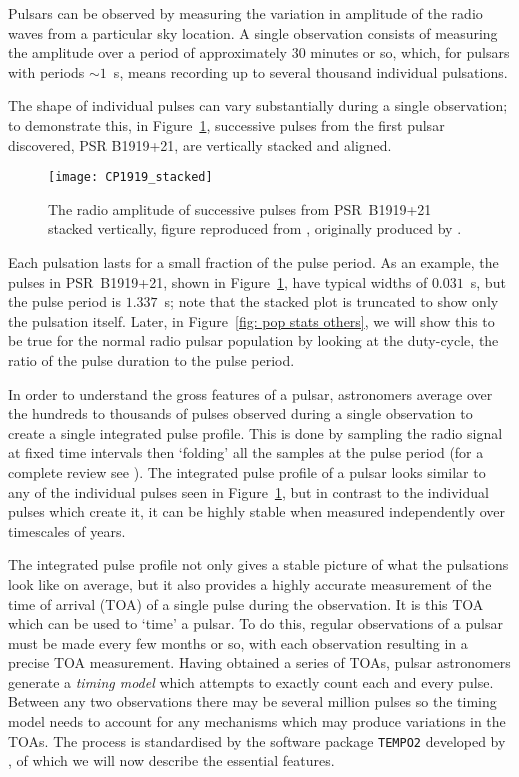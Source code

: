Pulsars can be observed by measuring the variation in amplitude of the radio
waves from a particular sky location. A single observation consists of measuring
the amplitude over a period of approximately $30$ minutes or so, which, for pulsars
with periods $\sim 1$~s, means recording up to several thousand individual pulsations.

The shape of individual pulses can vary substantially during a single
observation; to demonstrate this, in Figure~\ref{fig: CP1919 stacked}, successive pulses
from the first pulsar discovered, PSR B1919+21, are vertically stacked and
aligned.
\begin{figure}[htb]
\centering
\texttt{[image: CP1919\_stacked]}
\caption{The radio amplitude of successive pulses from PSR~B1919+21 stacked
vertically, figure reproduced from \citet{mitton1977cambridge}, originally
produced by \citet{craft1970}.}
\label{fig: CP1919 stacked}
\end{figure}
Each pulsation lasts for a small fraction of the pulse period. As an example,
the pulses in PSR~B1919+21, shown in Figure~\ref{fig: CP1919 stacked}, have
typical widths of $0.031$~s, but the pulse period is $1.337$~s; note that the
stacked plot is truncated to show only the pulsation itself. Later,
in Figure~\ref{fig: pop stats others}, we will show this to be true for the
normal radio pulsar population by looking at the duty-cycle, the ratio of the
pulse duration to the pulse period.

In order to understand the gross features of a pulsar, astronomers average over
the hundreds to thousands of pulses observed during a single observation to
create a single integrated pulse profile. This is done by sampling the radio
signal at fixed time intervals then `folding' all the samples at the pulse
period (for a complete review see \citet{Lyne2012book}). The integrated pulse
profile of a pulsar looks similar to any of the individual pulses seen in
Figure~\ref{fig: CP1919 stacked}, but in contrast to the individual pulses which
create it, it can be highly stable when measured independently over timescales
of years.

The integrated pulse profile not only gives a stable picture of what the
pulsations look like on average, but it also provides a highly accurate
measurement of the time of arrival (TOA) of a single pulse during the
observation. It is this TOA
which can be used to `time' a pulsar. To do this, regular observations of a
pulsar must be made every few months or so, with each observation resulting in a
precise TOA measurement. Having obtained a series of TOAs, pulsar astronomers
generate a \emph{timing model} which attempts to exactly count each and every
pulse. Between any two observations there may be several million pulses so the
timing model needs to account for any mechanisms which may produce variations
in the TOAs.  The process is standardised by the software package
\texttt{TEMPO2} developed by \citet{Hobbs2006}, of which we will now describe the
essential features.

